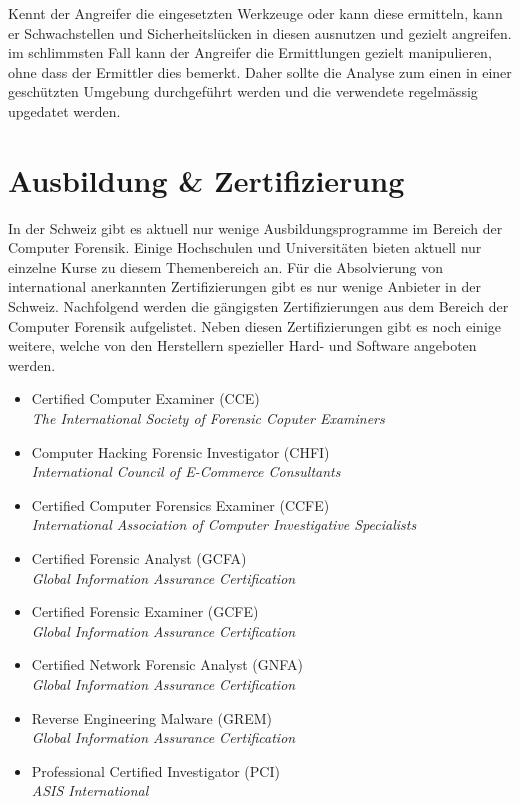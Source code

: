Kennt der Angreifer die eingesetzten Werkzeuge oder kann diese ermitteln, kann er Schwachstellen und Sicherheitslücken in diesen ausnutzen und gezielt angreifen. im schlimmsten Fall kann der Angreifer die Ermittlungen gezielt manipulieren, ohne dass der Ermittler dies bemerkt. Daher sollte die Analyse zum einen in einer geschützten Umgebung durchgeführt werden und die verwendete regelmässig upgedatet werden.



\section{Ausbildung \& Zertifizierung}
In der Schweiz gibt es aktuell nur wenige Ausbildungsprogramme im Bereich der Computer Forensik. Einige Hochschulen und Universitäten bieten aktuell nur einzelne Kurse zu diesem Themenbereich an. Für die Absolvierung von international anerkannten Zertifizierungen gibt es nur wenige Anbieter in der Schweiz. Nachfolgend werden die gängigsten Zertifizierungen aus dem Bereich der Computer Forensik aufgelistet. Neben diesen Zertifizierungen gibt es noch einige weitere, welche von den Herstellern spezieller Hard- und Software angeboten werden.

\begin{itemize}
\item Certified Computer Examiner (CCE) \\
\textit{The International Society of Forensic Coputer Examiners}

\item Computer Hacking Forensic Investigator (CHFI) \\
\textit{International Council of E-Commerce Consultants}

\item Certified Computer Forensics Examiner (CCFE) \\
\textit{International Association of Computer Investigative Specialists}

\item Certified Forensic Analyst (GCFA)\\
\textit{Global Information Assurance Certification}
\item Certified Forensic Examiner (GCFE)\\
\textit{Global Information Assurance Certification}
\item Certified Network Forensic Analyst (GNFA)\\
\textit{Global Information Assurance Certification}
\item Reverse Engineering Malware (GREM)\\
\textit{Global Information Assurance Certification}

\item Professional Certified Investigator (PCI)\\
\textit{ASIS International}
\end{itemize}


